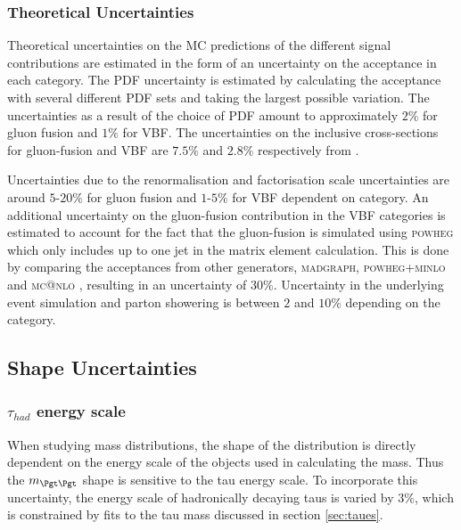 \subsubsection{\textbf{Theoretical Uncertainties}} 
Theoretical uncertainties on the \ac{MC} predictions of the different signal
contributions are estimated in the form of an uncertainty on the acceptance in
each category. The \ac{PDF} uncertainty is estimated by calculating the
acceptance with several different \ac{PDF} sets and taking the largest possible
variation. The uncertainties as a result of the choice of \ac{PDF} amount to
approximately $2\%$ for gluon fusion and $1\%$ for \ac{VBF}. The uncertainties
on the inclusive cross-sections for gluon-fusion and \ac{VBF} are $7.5\%$ and
$2.8\%$ respectively from
\cite{LHCHiggsCrossSectionWorkingGroup:2011ti,Dittmaier:2012vm,Heinemeyer:2013tqa}.

Uncertainties due to the renormalisation and factorisation scale uncertainties
are around $5$-$20\%$ for gluon fusion and $1$-$5\%$ for \ac{VBF} dependent on
category. An additional uncertainty on the gluon-fusion contribution in the
VBF categories is estimated to account for the fact that the gluon-fusion is
simulated using \textsc{powheg} which only includes up to one jet in the matrix
element calculation. This is done by comparing the acceptances from other
generators, \textsc{madgraph}, \textsc{powheg+minlo} \cite{Hamilton:2012np} and
\textsc{mc@nlo} \cite{Frixione:2002ik}, resulting in an uncertainty of $30\%$.
Uncertainty in the underlying event simulation and parton showering is between
$2$ and $10\%$ depending on the category. 


\subsection{Shape Uncertainties}
\label{sec:systematicUncertainties_yield}

\subsubsection{$\tau_{had}$ energy scale} 
When studying mass distributions, the shape of the distribution is directly
dependent on the energy scale of the objects used in calculating the mass. Thus the
$m_{\Pgt\Pgt}$ shape is sensitive to the tau energy scale.
To incorporate this uncertainty, the energy scale of hadronically decaying taus is varied by $3\%$,
which is constrained by fits to the tau mass discussed in section \ref{sec:taues}.

